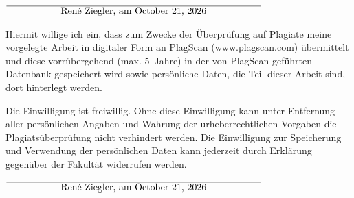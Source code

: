 \documentclass[12pt,oneside,a4paper,parskip]{scrbook}
\def\BaAuthor{René Ziegler}
\begin{document}
\vspace{20pt}
\begin{flushright}
$\overline{~~~~~~~~~~~~~~~~~\mbox{\BaAuthor, am \today}~~~~~~~~~~~~~~~~~}$
\end{flushright}


Hiermit willige ich ein, dass zum Zwecke der Überprüfung auf Plagiate meine vorgelegte Arbeit in digitaler Form an PlagScan (www.plagscan.com) übermittelt und diese vorrübergehend (max. 5~Jahre) in der von PlagScan geführten Datenbank gespeichert wird sowie persönliche Daten, die Teil dieser Arbeit sind, dort hinterlegt werden.

\begin{small}
Die Einwilligung ist freiwillig. Ohne diese Einwilligung kann unter Entfernung aller persönlichen Angaben und Wahrung der urheberrechtlichen Vorgaben die Plagiatsüberprüfung nicht verhindert werden. Die Einwilligung zur Speicherung und Verwendung der persönlichen Daten kann jederzeit durch Erklärung gegenüber der Fakultät widerrufen werden.
\end{small}

\vspace{20pt}
\begin{flushright}
$\overline{~~~~~~~~~~~~~~~~~\mbox{\BaAuthor, am \today}~~~~~~~~~~~~~~~~~}$
\end{flushright}
\end{document}
